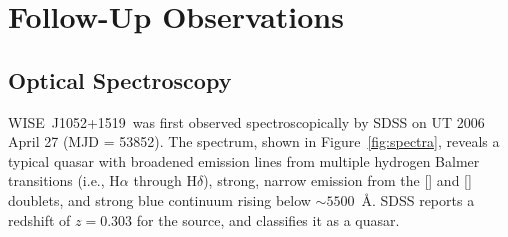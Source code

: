 \documentclass[iop]{emulateapj}
\def\ie{{i.e.}}
\def\qso{WISE~J1052+1519}
\begin{document}


\section{Follow-Up Observations}

\subsection{Optical Spectroscopy}

\qso\ was first observed spectroscopically by SDSS on UT 2006 April
27 (MJD = 53852).  The spectrum, shown in Figure~\ref{fig:spectra},
reveals a typical quasar with broadened emission lines from multiple
hydrogen Balmer transitions (i.e., H$\alpha$ through H$\delta$),
strong, narrow emission from the [] and []
doublets, and strong blue continuum rising below $\sim 5500$~\AA.
SDSS reports a redshift of $z = 0.303$ for the source, and classifies
it as a quasar.
\end{document}

